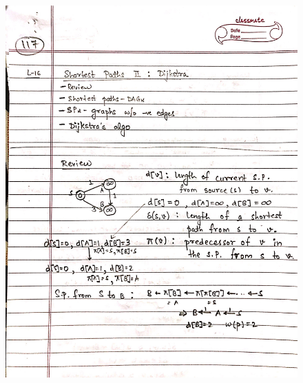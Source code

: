 \begin{figure}[H]
    \centering
    \includegraphics[width=16cm, height=21cm]{"./MIT-6.006/MIT-6006-117"}
\end{figure}
\newpage
